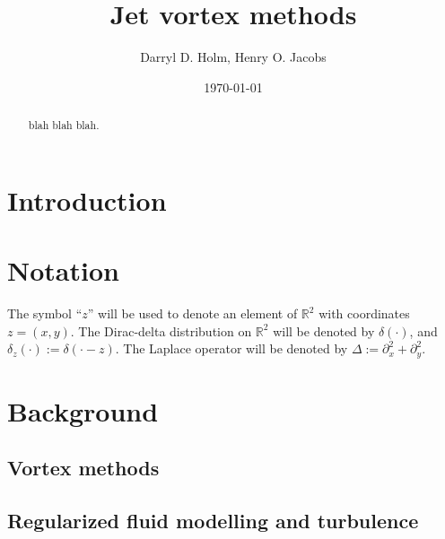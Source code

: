 \documentclass[12pt]{amsart}
\title{Jet vortex methods}
\author{Darryl D. Holm, Henry O. Jacobs}
\date{\today}
\begin{document}
\maketitle

\begin{abstract}
  blah blah blah.
\end{abstract}

\section{Introduction}
\label{sec:intro}


\section{Notation}
The symbol ``$z$'' will be used to denote
an element of $\mathbb{R}^2$
with coordinates $z = (x,y)$.
The Dirac-delta distribution on $\mathbb{R}^2$
will be denoted by $\delta(\cdot)$, and $\delta_z(\cdot) := \delta( \cdot - z)$.
The Laplace operator will be denoted by $\Delta := \partial_x^2 + \partial_y^2$.

\section{Background}

\subsection{Vortex methods}

\subsection{Regularized fluid modelling and turbulence}

\end{document}
